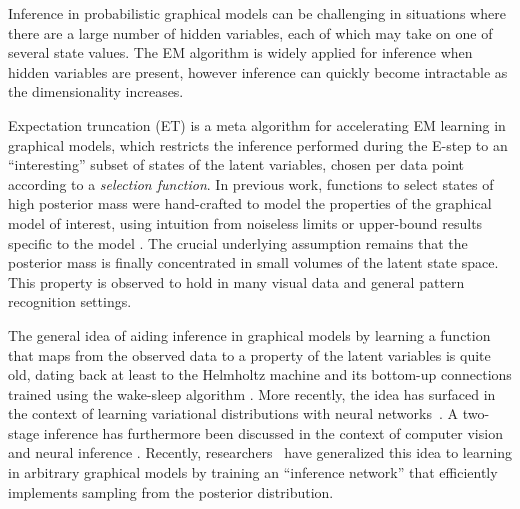 Inference in probabilistic graphical models can be challenging in situations where
there are a large number of hidden variables, each of which may take on one of several
state values. The EM algorithm is widely applied for inference when hidden variables
are present, however inference can quickly become intractable as the dimensionality increases.



Expectation truncation (ET) \citep{LuckeEggert2010} is a meta algorithm for accelerating EM learning
in graphical models, which restricts the inference performed during the E-step
to an ``interesting'' subset of states of the latent variables,  %
chosen per data point according to a \emph{selection function}.
In previous work, functions to select states of high posterior mass were hand-crafted to model the properties of the graphical model of interest, using intuition from noiseless limits or upper-bound results specific to the model \citep{LuckeEggert2010,SheltonEtAl2012,BornscheinEtAl2013,SheikhEtAl2014}.
The crucial underlying assumption remains that the posterior mass is finally concentrated in small volumes of the latent state space.
This property is observed to hold in many visual data and general pattern recognition settings.

The general idea of aiding inference in graphical models by
learning a function that maps from the observed data to
a property of the latent variables is quite old, dating back at least to the
Helmholtz machine and its bottom-up connections trained using the wake-sleep
algorithm \citep{HintonEtAl1995}.
More recently, the idea has surfaced in the context of learning variational distributions with neural networks~\citep{WellingICML2014}.
A two-stage inference has furthermore been discussed in the context of
computer vision \citep{YuilleKersten2006} and neural inference \citep{KoernerEtAl1999}.
Recently, researchers~\citep{MnihGregor2014} %
have generalized this idea to learning in arbitrary graphical models by training
an ``inference network'' that efficiently implements sampling from the posterior
distribution.

